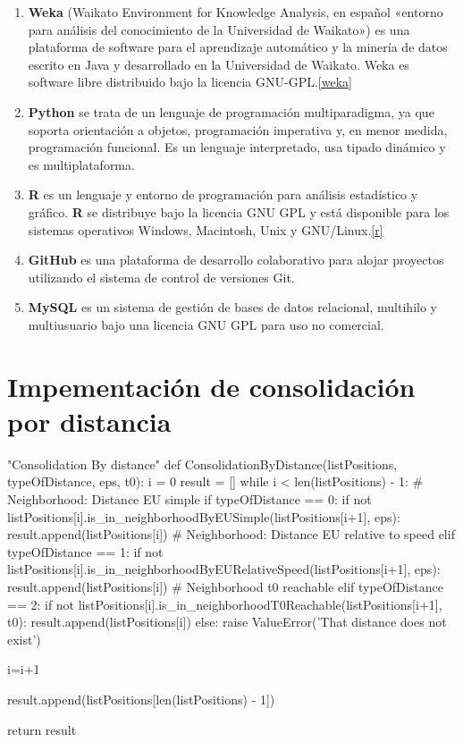 \documentclass[a4paper, 12pt]{article}
\begin{document}
\begin{enumerate}
	\item \textbf{Weka} (Waikato Environment for Knowledge Analysis, en espa\~nol «entorno para an\'alisis del conocimiento de la Universidad de Waikato») es una plataforma de software para el aprendizaje autom\'atico y la miner\'ia de datos escrito en Java y desarrollado en la Universidad de Waikato. Weka es software libre distribuido bajo la licencia GNU-GPL.\ref{weka}
	
	\item \textbf{Python} se trata de un lenguaje de programaci\'on multiparadigma, ya que soporta orientaci\'on a objetos, programaci\'on imperativa y, en menor medida, programaci\'on funcional. Es un lenguaje interpretado, usa tipado dinámico y es multiplataforma.
	
	\item \textbf{R} es un lenguaje y entorno de programaci\'on para an\'alisis estad\'istico y gr\'afico. \textbf{R} se distribuye bajo la licencia GNU GPL y est\'a disponible para los sistemas operativos Windows, Macintosh, Unix y GNU/Linux.\ref{r}
	
	\item \textbf{GitHub} es una plataforma de desarrollo colaborativo para alojar proyectos utilizando el sistema de control de versiones Git.
	
	\item \textbf{MySQL} es un sistema de gesti\'on de bases de datos relacional, multihilo y multiusuario bajo una licencia GNU GPL para uso no comercial.
	
\end{enumerate}


\newpage


\appendix
\section{Impementaci\'on de consolidaci\'on por distancia} \label{App:AppendixA}

\begin{python}
"Consolidation By distance"
def ConsolidationByDistance(listPositions, typeOfDistance, eps, t0):
	i = 0
	result = []
	while i < len(listPositions) - 1:
		# Neighborhood: Distance EU simple
		if typeOfDistance == 0:
			if not listPositions[i].is_in_neighborhoodByEUSimple(listPositions[i+1], eps):
				result.append(listPositions[i])
		# Neighborhood: Distance EU relative to speed
		elif typeOfDistance == 1:
			if not listPositions[i].is_in_neighborhoodByEURelativeSpeed(listPositions[i+1], eps):
				result.append(listPositions[i])
		# Neighborhood t0 reachable
		elif typeOfDistance == 2:
			if not listPositions[i].is_in_neighborhoodT0Reachable(listPositions[i+1], t0):
				result.append(listPositions[i])
		else:
			raise ValueError('That distance does not exist')

		i=i+1

	result.append(listPositions[len(listPositions) - 1])

	return result

\end{python}
\end{document}
